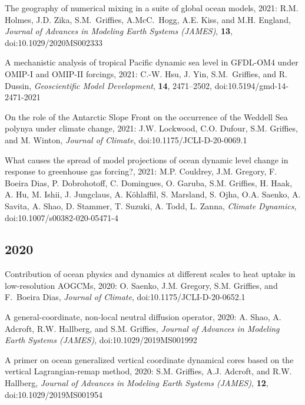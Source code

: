 \begin{etaremune}
\item The geography of numerical mixing in a suite of global ocean models, 2021: R.M. Holmes, J.D. Zika, S.M.\ Grif\/f\/ies,  A.McC.\ Hogg, A.E. Kiss, and M.H. England, {\it Journal of Advances in Modeling Earth Systems (JAMES)}, {\bf 13},  \\ doi:10.1029/2020MS002333

\item A mechanistic analysis of tropical Pacific dynamic sea level in GFDL-OM4 under OMIP-I and OMIP-II forcings, 2021: C.-W. Hsu, J. Yin, S.M.\ Grif\/f\/ies, and R. Dussin, {\it Geoscientific Model Development}, {\bf 14}, 2471--2502, doi:10.5194/gmd-14-2471-2021

\item On the role of the Antarctic Slope Front on the occurrence of the Weddell Sea polynya under climate change, 2021: J.W. Lockwood, C.O. Dufour, S.M. Grif\/f\/ies, and M. Winton, {\it Journal of Climate}, doi:10.1175/JCLI-D-20-0069.1

\item What causes the spread of model projections of ocean dynamic level change in response to greenhouse gas forcing?, 2021:  M.P. Couldrey, J.M. Gregory,  F. Boeira Dias, P. Dobrohotoff, C. Domingues, O. Garuba, S.M. Griffies, H. Haak, A. Hu, M. Ishii, J. Jungclaus, A. {K\"{o}hlaffil}, S. Marsland, S. Ojha, O.A. Saenko, A. Savita, A. Shao, D. Stammer, T. Suzuki, A. Todd, L. Zanna, {\it Climate Dynamics}, doi:10.1007/s00382-020-05471-4


\subsection*{\sc \color{Maroon} 2020}

\item Contribution of ocean physics and dynamics at different scales to heat uptake in low-resolution AOGCMs, 2020: O. Saenko, J.M. Gregory, S.M. Grif\/f\/ies, and F.\ Boeira Dias, {\it Journal of Climate}, doi:10.1175/JCLI-D-20-0652.1

\item A general-coordinate, non-local neutral diffusion operator, 2020: A. Shao, A. Adcroft, R.W. Hallberg, and S.M. Grif\/f\/ies, {\it Journal of Advances in Modeling Earth Systems (JAMES)}, doi:10.1029/2019MS001992



\item A primer on ocean generalized vertical coordinate dynamical cores based on the vertical Lagrangian-remap method, 2020: S.M. Grif\/f\/ies, A.J. Adcroft, and R.W. Hallberg, {\it Journal of Advances in Modeling Earth Systems (JAMES)}, {\bf 12}, \\ doi:10.1029/2019MS001954


\end{etaremune}
